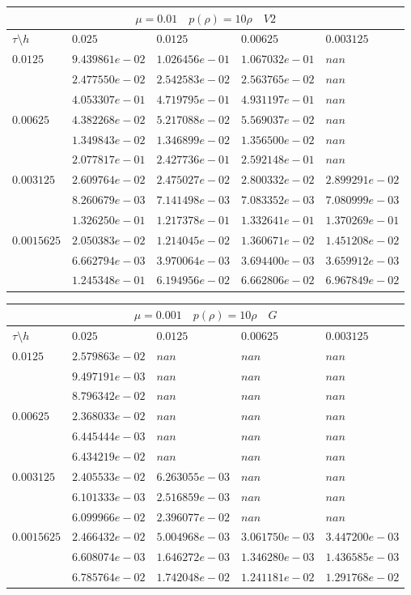 \documentclass[a4paper,12pt]{extarticle}
\begin{document}
\begin{tabular}{|l|l|l|l|l|}
	\hline
	\multicolumn{5}{|c|}{$\mu =0.01 \quad  p(\rho) =10 \rho \quad V2$}\\
	\hline
	$\tau\setminus h$ & $0.025$ & $0.0125$ & $0.00625$ & $0.003125$\\
	\hline
	$0.0125$  & $9.439861e-02$ & $1.026456e-01$ & $1.067032e-01$ & $nan$\\
	& $2.477550e-02$ & $2.542583e-02$ & $2.563765e-02$ & $nan$\\
	& $4.053307e-01$ & $4.719795e-01$ & $4.931197e-01$ & $nan$\\
	\hline
	$0.00625$  & $4.382268e-02$ & $5.217088e-02$ & $5.569037e-02$ & $nan$\\
	& $1.349843e-02$ & $1.346899e-02$ & $1.356500e-02$ & $nan$\\
	& $2.077817e-01$ & $2.427736e-01$ & $2.592148e-01$ & $nan$\\
	\hline
	$0.003125$  & $2.609764e-02$ & $2.475027e-02$ & $2.800332e-02$ & $2.899291e-02$\\
	& $8.260679e-03$ & $7.141498e-03$ & $7.083352e-03$ & $7.080999e-03$\\
	& $1.326250e-01$ & $1.217378e-01$ & $1.332641e-01$ & $1.370269e-01$\\
	\hline
	$0.0015625$  & $2.050383e-02$ & $1.214045e-02$ & $1.360671e-02$ & $1.451208e-02$\\
	& $6.662794e-03$ & $3.970064e-03$ & $3.694400e-03$ & $3.659912e-03$\\
	& $1.245348e-01$ & $6.194956e-02$ & $6.662806e-02$ & $6.967849e-02$\\
	\hline
\end{tabular}

\begin{tabular}{|l|l|l|l|l|}
	\hline
	\multicolumn{5}{|c|}{$\mu =0.001 \quad  p(\rho) =10 \rho \quad G$}\\
	\hline
	$\tau\setminus h$ & $0.025$ & $0.0125$ & $0.00625$ & $0.003125$\\
	\hline
	$0.0125$  & $2.579863e-02$ & $nan$ & $nan$ & $nan$\\
	& $9.497191e-03$ & $nan$ & $nan$ & $nan$\\
	& $8.796342e-02$ & $nan$ & $nan$ & $nan$\\
	\hline
	$0.00625$  & $2.368033e-02$ & $nan$ & $nan$ & $nan$\\
	& $6.445444e-03$ & $nan$ & $nan$ & $nan$\\
	& $6.434219e-02$ & $nan$ & $nan$ & $nan$\\
	\hline
	$0.003125$  & $2.405533e-02$ & $6.263055e-03$ & $nan$ & $nan$\\
	& $6.101333e-03$ & $2.516859e-03$ & $nan$ & $nan$\\
	& $6.099966e-02$ & $2.396077e-02$ & $nan$ & $nan$\\
	\hline
	$0.0015625$  & $2.466432e-02$ & $5.004968e-03$ & $3.061750e-03$ & $3.447200e-03$\\
	& $6.608074e-03$ & $1.646272e-03$ & $1.346280e-03$ & $1.436585e-03$\\
	& $6.785764e-02$ & $1.742048e-02$ & $1.241181e-02$ & $1.291768e-02$\\
	\hline
\end{tabular}
\end{document}
